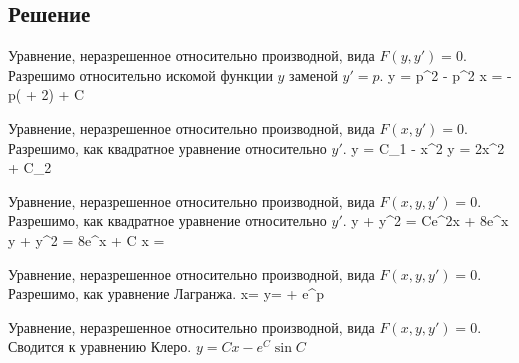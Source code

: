\subsection{Решение}
\begin{enumerate}
    \solutionItemFirst
        {\equationFirst}
        {
        	Уравнение, неразрешенное относительно производной,
        	вида $ F(y, y') = 0 $. \\
        	Разрешимо относительно искомой функции $ y $ заменой $ y' = p $.
        }
        {
        	\customCases
        		{y = p^2 - p^2 }
        		{x =  - p( + 2) + C}
        }

	\clearpage

    \solutionItemFirst
	    {\equationSecond}
	    {
	    	Уравнение, неразрешенное относительно производной,
	    	вида $ F(x, y') = 0 $. \\
	    	Разрешимо, как квадратное уравнение относительно $ y' $.
    	}
	    {
	    	\customCases
				{y = C_1 - x^2}
				{y = 2x^2 + C_2}
    	}

	\vspace{2em}

	\solutionItemFirst
		{\equationThird}
		{
			Уравнение, неразрешенное относительно производной,
			вида $ F(x, y, y') = 0 $. \\
			Разрешимо, как квадратное уравнение относительно $ y' $.
		}
		{
			\customCases
				{y + y^2 = Ce^{2x} + 8e^x}
				{y + y^2 = 8e^x + C}
				{x = }
		}

	\vspace{2em}

	\solutionItemFirst
		{\equationFourth}
		{
			Уравнение, неразрешенное относительно производной,
			вида $ F(x, y, y') = 0 $. \\
			Разрешимо, как уравнение Лагранжа.
		}
		{
			\customCases
				{x=}	
				{y= + e^p}
		}

	\clearpage

	\solutionItemFirst
		{\equationFifth}
		{
			Уравнение, неразрешенное относительно производной,
			вида $ F(x, y, y') = 0 $. \\
			Сводится к уравнению Клеро.
		}
		{$ y=Cx-e^C\sin{C} $}

\end{enumerate} 
